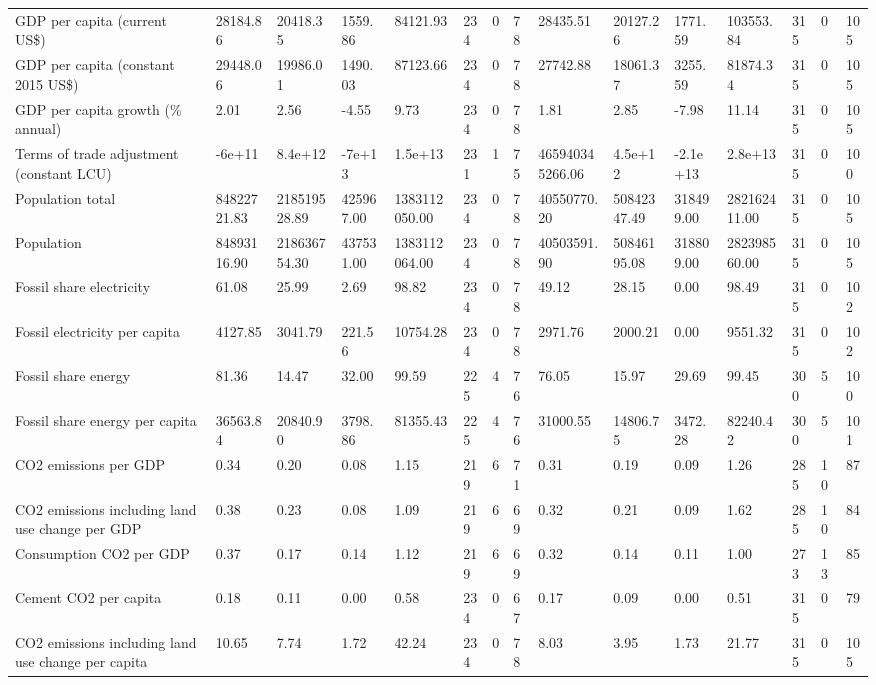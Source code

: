 \begin{longtable}{lllllllllllllll}
GDP per capita (current US\$) & 28184.86 & 20418.35 & 1559.86 & 84121.93 & 234 & 0 & 78 & 28435.51 & 20127.26 & 1771.59 & 103553.84 & 315 & 0 & 105\\
GDP per capita (constant 2015 US\$) & 29448.06 & 19986.01 & 1490.03 & 87123.66 & 234 & 0 & 78 & 27742.88 & 18061.37 & 3255.59 & 81874.34 & 315 & 0 & 105\\
GDP per capita growth (\% annual) & 2.01 & 2.56 & -4.55 & 9.73 & 234 & 0 & 78 & 1.81 & 2.85 & -7.98 & 11.14 & 315 & 0 & 105\\
\addlinespace
Terms of trade adjustment (constant LCU) & -6e+11 & 8.4e+12 & -7e+13 & 1.5e+13 & 231 & 1 & 75 & 465940345266.06 & 4.5e+12 & -2.1e+13 & 2.8e+13 & 315 & 0 & 100\\
Population total & 84822721.83 & 218519528.89 & 425967.00 & 1383112050.00 & 234 & 0 & 78 & 40550770.20 & 50842347.49 & 318499.00 & 282162411.00 & 315 & 0 & 105\\
Population & 84893116.90 & 218636754.30 & 437531.00 & 1383112064.00 & 234 & 0 & 78 & 40503591.90 & 50846195.08 & 318809.00 & 282398560.00 & 315 & 0 & 105\\
Fossil share electricity & 61.08 & 25.99 & 2.69 & 98.82 & 234 & 0 & 78 & 49.12 & 28.15 & 0.00 & 98.49 & 315 & 0 & 102\\
Fossil electricity per capita & 4127.85 & 3041.79 & 221.56 & 10754.28 & 234 & 0 & 78 & 2971.76 & 2000.21 & 0.00 & 9551.32 & 315 & 0 & 102\\
\addlinespace
Fossil share energy & 81.36 & 14.47 & 32.00 & 99.59 & 225 & 4 & 76 & 76.05 & 15.97 & 29.69 & 99.45 & 300 & 5 & 100\\
Fossil share energy per capita & 36563.84 & 20840.90 & 3798.86 & 81355.43 & 225 & 4 & 76 & 31000.55 & 14806.75 & 3472.28 & 82240.42 & 300 & 5 & 101\\
CO2 emissions per GDP & 0.34 & 0.20 & 0.08 & 1.15 & 219 & 6 & 71 & 0.31 & 0.19 & 0.09 & 1.26 & 285 & 10 & 87\\
CO2 emissions including land use change per GDP & 0.38 & 0.23 & 0.08 & 1.09 & 219 & 6 & 69 & 0.32 & 0.21 & 0.09 & 1.62 & 285 & 10 & 84\\
Consumption CO2 per GDP & 0.37 & 0.17 & 0.14 & 1.12 & 219 & 6 & 69 & 0.32 & 0.14 & 0.11 & 1.00 & 273 & 13 & 85\\
\addlinespace
Cement CO2 per capita & 0.18 & 0.11 & 0.00 & 0.58 & 234 & 0 & 67 & 0.17 & 0.09 & 0.00 & 0.51 & 315 & 0 & 79\\
CO2 emissions including land use change per capita & 10.65 & 7.74 & 1.72 & 42.24 & 234 & 0 & 78 & 8.03 & 3.95 & 1.73 & 21.77 & 315 & 0 & 105\\

\end{longtable}

